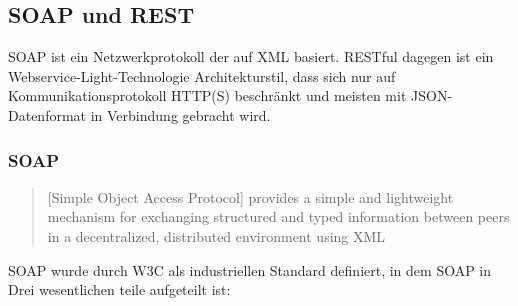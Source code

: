\subsection{SOAP und REST}
SOAP ist ein Netzwerkprotokoll der auf XML basiert. RESTful dagegen ist ein Webservice-Light-Technologie Architekturstil, dass sich nur auf Kommunikationsprotokoll HTTP(S) beschränkt und meisten mit JSON-Datenformat in Verbindung gebracht wird.

\subsubsection{SOAP}
\begin{quote}
[Simple Object Access Protocol] provides a simple and lightweight mechanism for exchanging structured and typed information between peers in a decentralized, distributed environment using XML
\end{quote}
SOAP wurde durch W3C als industriellen Standard definiert, in dem SOAP in Drei wesentlichen teile aufgeteilt ist:
